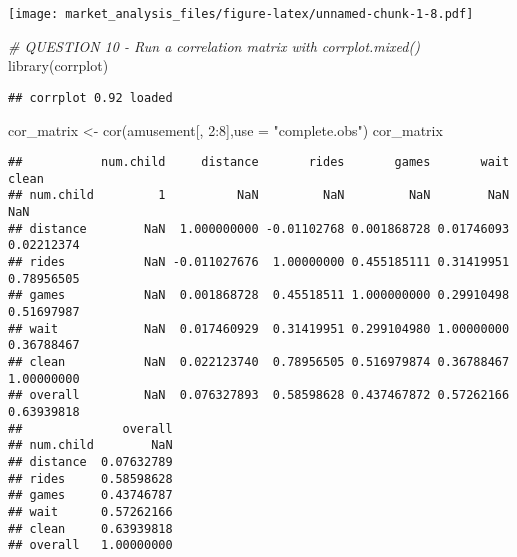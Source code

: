\documentclass[
]{article}
\newenvironment{Shaded}{\begin{snugshade}}{\end{snugshade}}
\newcommand{\AttributeTok}[1]{\textcolor[rgb]{0.77,0.63,0.00}{#1}}
\newcommand{\CommentTok}[1]{\textcolor[rgb]{0.56,0.35,0.01}{\textit{#1}}}
\newcommand{\DecValTok}[1]{\textcolor[rgb]{0.00,0.00,0.81}{#1}}
\newcommand{\FunctionTok}[1]{\textcolor[rgb]{0.00,0.00,0.00}{#1}}
\newcommand{\NormalTok}[1]{#1}
\newcommand{\OtherTok}[1]{\textcolor[rgb]{0.56,0.35,0.01}{#1}}
\newcommand{\SpecialCharTok}[1]{\textcolor[rgb]{0.00,0.00,0.00}{#1}}
\newcommand{\StringTok}[1]{\textcolor[rgb]{0.31,0.60,0.02}{#1}}
\begin{document}
\begin{Shaded}
\end{Shaded}

\texttt{[image: market\_analysis\_files/figure-latex/unnamed-chunk-1-8.pdf]}

\begin{Shaded}
\begin{Highlighting}[]
\CommentTok{\# QUESTION 10 {-}  Run a correlation matrix with corrplot.mixed() }
\FunctionTok{library}\NormalTok{(corrplot)}
\end{Highlighting}
\end{Shaded}

\begin{verbatim}
## corrplot 0.92 loaded
\end{verbatim}

\begin{Shaded}
\begin{Highlighting}[]
\NormalTok{cor\_matrix }\OtherTok{\textless{}{-}} \FunctionTok{cor}\NormalTok{(amusement[, }\DecValTok{2}\SpecialCharTok{:}\DecValTok{8}\NormalTok{],}\AttributeTok{use =} \StringTok{"complete.obs"}\NormalTok{)}
\NormalTok{cor\_matrix}
\end{Highlighting}
\end{Shaded}

\begin{verbatim}
##           num.child     distance       rides       games       wait      clean
## num.child         1          NaN         NaN         NaN        NaN        NaN
## distance        NaN  1.000000000 -0.01102768 0.001868728 0.01746093 0.02212374
## rides           NaN -0.011027676  1.00000000 0.455185111 0.31419951 0.78956505
## games           NaN  0.001868728  0.45518511 1.000000000 0.29910498 0.51697987
## wait            NaN  0.017460929  0.31419951 0.299104980 1.00000000 0.36788467
## clean           NaN  0.022123740  0.78956505 0.516979874 0.36788467 1.00000000
## overall         NaN  0.076327893  0.58598628 0.437467872 0.57262166 0.63939818
##              overall
## num.child        NaN
## distance  0.07632789
## rides     0.58598628
## games     0.43746787
## wait      0.57262166
## clean     0.63939818
## overall   1.00000000
\end{verbatim}
\end{document}
